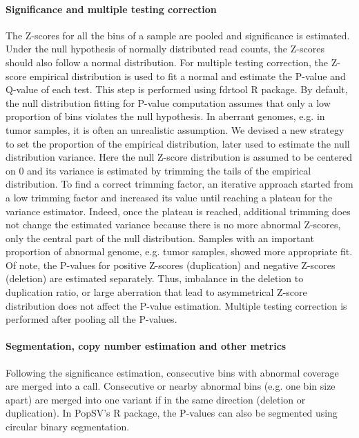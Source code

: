 \paragraph{Significance and multiple testing correction}
The Z-scores for all the bins of a sample are pooled and significance is estimated. Under the null hypothesis of normally distributed read counts, the Z-scores should also follow a normal distribution. For multiple testing correction, the Z-score empirical distribution is used to fit a normal and estimate the P-value and Q-value of each test. This step is performed using fdrtool R package.
By default, the null distribution fitting for P-value computation assumes that only a low proportion of bins violates the null hypothesis. In aberrant genomes, e.g. in tumor samples, it is often an unrealistic assumption. We devised a new strategy to set the proportion of the empirical distribution, later used to estimate the null distribution variance. Here the null Z-score distribution is assumed to be centered on 0 and its variance is estimated by trimming the tails of the empirical distribution. To find a correct trimming factor, an iterative approach started from a low trimming factor and increased its value until reaching a plateau for the variance estimator. Indeed, once the plateau is reached, additional trimming does not change the estimated variance because there is no more abnormal Z-scores, only the central part of the null distribution. Samples with an important proportion of abnormal genome, e.g. tumor samples, showed more appropriate fit.
Of note, the P-values for positive Z-scores (duplication) and negative Z-scores (deletion) are estimated separately. Thus, imbalance in the deletion to duplication ratio, or large aberration that lead to asymmetrical Z-score distribution does not affect the P-value estimation. Multiple testing correction is performed after pooling all the P-values.

\paragraph{Segmentation, copy number estimation and other metrics}
Following the significance estimation, consecutive bins with abnormal coverage are merged into a call.
Consecutive or nearby abnormal bins (e.g. one bin size apart) are merged into one variant if in the same direction (deletion or duplication).
In {\sf PopSV}'s R package, the P-values can also be segmented using circular binary segmentation\cite{Seshan2017}.

